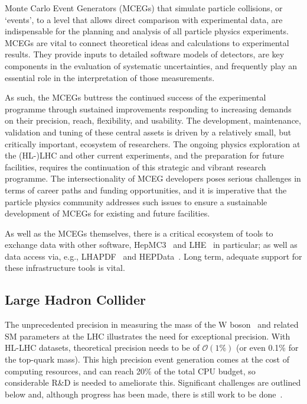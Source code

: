 \documentclass[10pt,a4paper]{article}
\begin{document}
Monte Carlo Event Generators (MCEGs) that simulate particle collisions,
or `events', to a level that allows direct comparison with
experimental data, are indispensable for the planning and analysis of
all particle physics experiments. MCEGs are vital to connect
theoretical ideas and calculations
to experimental results. They provide inputs to
detailed software models of detectors, are key components in the
evaluation of systematic uncertainties, and frequently
play an essential role in the interpretation of those measurements.

As such, the MCEGs buttress the continued success of the experimental programme
through sustained improvements responding to increasing demands on their
precision, reach, flexibility, and usability. The development, maintenance,
validation and tuning of these central assets is driven by a relatively small,
but critically important, ecosystem of researchers. The ongoing physics
exploration at the (HL-)LHC and other current experiments, and the preparation
for future facilities, requires the continuation of this strategic and vibrant
research programme. The intersectionality of MCEG developers poses serious
challenges in terms of career paths and funding opportunities, and it is
imperative that the particle physics community addresses such issues to ensure a
sustainable development of MCEGs for existing and future facilities.

As well as the MCEGs themselves, there is a critical ecosystem of tools to
exchange data with other software, HepMC3~\cite{BUCKLEY2021107310} and
LHE~\cite{ALWALL2007300} in particular; as well as data access via, e.g.,
LHAPDF~\cite{Buckley2015LHAPDF} and HEPData~\cite{Maguire_2017}. Long term,
adequate support for these infrastructure tools is vital.

\subsection{Large Hadron Collider}\label{large-hadron-collider}

The unprecedented precision in measuring the mass of the $\mathrm{W}$
boson~\cite{CMS:2024lrd} and related SM parameters at the LHC illustrates the
need for exceptional precision. With HL-LHC datasets, theoretical precision
needs to be of $\mathcal{O}(1\%)$ (or even 0.1\% for the top-quark mass). This
high precision event generation comes at the cost of computing resources, and
can reach 20\% of the total CPU budget, so considerable R\&D is needed to
ameliorate this. Significant challenges are outlined below and, although
progress has been made, there is still work to be
done~\cite{HSFPhysicsEventGeneratorWG:2020gxw,maltoni2022tf07snowmassreporttheory,10.21468/SciPostPhys.16.5.130}.
\end{document}
